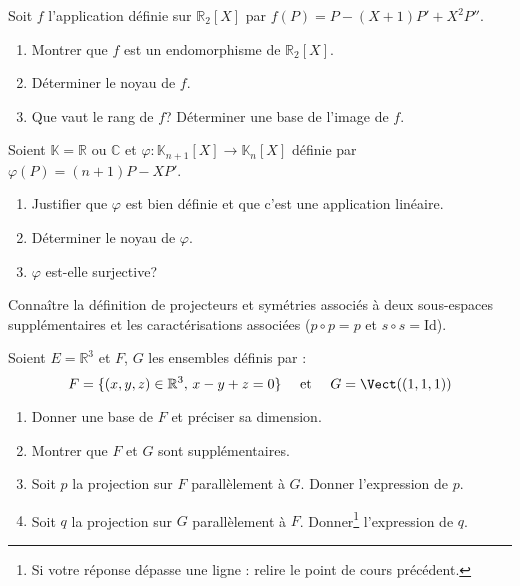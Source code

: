 \documentclass[a4paper,twoside,french,11pt]{VcCours}
\begin{document}
\begin{Exercice}{}
  Soit $f$ l'application définie sur $\mathbb{R}_2[X]$ par $f(P)=P-(X+1)P'+X^2 P''$.
  \begin{enumerate}
    \item Montrer que $f$ est un endomorphisme de $\mathbb{R}_2[X]$.
    \item Déterminer le noyau de $f$.
    \item Que vaut le rang de $f$? Déterminer une base de l'image de $f$.
  \end{enumerate}
\end{Exercice} 
  
\begin{Exercice}{}
  Soient $\mathbb{K}= \mathbb{R}$ ou $\mathbb{C}$ et $\varphi : \mathbb{K}_{n+1}[X]\rightarrow \mathbb{K}_{n}[X]$ définie par $\varphi(P) = (n + 1)P - XP'$.
  \begin{enumerate}
    \item
    Justifier que $\varphi$ est bien définie et que c'est une application linéaire.
    \item
    Déterminer le noyau de $\varphi$.
    \item
    $\varphi$ est-elle surjective?
  \end{enumerate}
\end{Exercice} 

\begin{ptc}{}
	Connaître la définition de projecteurs et symétries associés à deux sous-espaces supplémentaires et les caractérisations associées ($p \circ p = p$ et $s \circ s = \textrm{Id}$).
\end{ptc} 

\begin{Exercice}{}
  Soient $E= \mathbb{R}^3$ et $F$, $G$ les ensembles définis par :
  $$ F = \lbrace (x,y,z) \in \mathbb{R}^3, \, x-y+z=0 \rbrace \quad \hbox{ et }  \quad G = \Vect((1,1,1)) $$
  
  \begin{enumerate}
    \item Donner une base de $F$ et préciser sa dimension.
    \item Montrer que $F$ et $G$ sont supplémentaires.
    \item Soit $p$ la projection sur $F$ parallèlement à $G$. Donner l'expression de $p$.
    \item Soit $q$ la projection sur $G$ parallèlement à $F$. Donner\footnote{Si votre réponse dépasse une ligne : relire le point de cours précédent.} l'expression de $q$.
  \end{enumerate}
\end{Exercice} 
  
\end{document}
